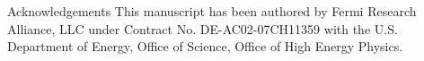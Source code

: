 \documentclass{beamer}
\begin{document}
\begin{frame}{}
\begin{columns}[t]
\begin{column}{0.32\textwidth}
                \begin{block}{\label{sec:acknowledgements}Acknowledgements}
                    This manuscript has been authored by Fermi Research Alliance, LLC under Contract No. DE-AC02-07CH11359 with the U.S. Department of Energy, Office of Science, Office of High Energy Physics.
                \end{block}
            \end{column}
        \end{columns}
    \end{frame}
\end{document}
